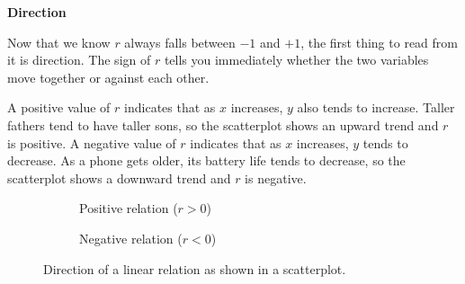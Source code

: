 \textbf{Direction}

Now that we know $r$ always falls between $-1$ and $+1$, the first
thing to read from it is direction. The sign of $r$ tells you
immediately whether the two variables move together or against each
other.

A positive value of $r$ indicates that as $x$ increases, $y$ also
tends to increase. Taller fathers tend to have taller sons, so the
scatterplot shows an upward trend and $r$ is positive. A negative value of $r$ indicates that as $x$ increases, $y$ tends
to decrease. As a phone gets older, its battery life tends to
decrease, so the scatterplot shows a downward trend and $r$ is
negative.

\begin{figure}[H]
    \centering
    \begin{subfigure}[b]{0.45\textwidth}
        \centering
        \caption{Positive relation ($r > 0$)}
    \end{subfigure}
    \hfill
    \begin{subfigure}[b]{0.45\textwidth}
        \centering
        \caption{Negative relation ($r < 0$)}
    \end{subfigure}
    \caption{Direction of a linear relation as shown in a scatterplot.}
    \label{fig:direction}
\end{figure}

